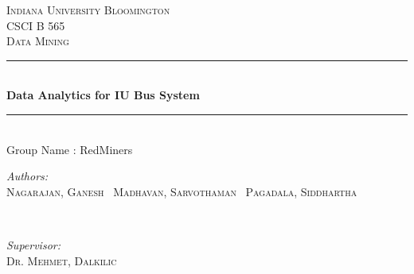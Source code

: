 \documentclass[12pt]{article}
\begin{document}
\begin{titlepage}

\newcommand{\HRule}{\rule{\linewidth}{0.5mm}}

\center 
 

\textsc{\LARGE Indiana University Bloomington}\\[1.5cm] 
\textsc{\Large CSCI B 565}\\[0.5cm] 
\textsc{\large Data Mining}\\[0.5cm] 


\HRule \\[0.4cm]
{ \huge \bfseries Data Analytics for IU Bus System}\\[0.4cm] 
\HRule \\[1.5cm]
\large Group Name : RedMiners \\
 

\begin{minipage}{0.4\textwidth}
\begin{flushleft} \large
\emph{Authors:}\\
\textsc{Nagarajan, Ganesh \ Madhavan, Sarvothaman \ Pagadala, Siddhartha} 
\end{flushleft}
\end{minipage}
~
\begin{minipage}{0.4\textwidth}
\begin{flushright} \large
\emph{Supervisor:} \\
\textsc{Dr. Mehmet, Dalkilic} 
\end{flushright}
\end{minipage}\\[2cm]




\end{titlepage}
\end{document}
